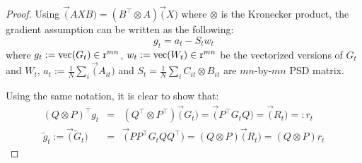 \begin{proof}
Using $\vec(AXB) = (B^\top \otimes A)\vec(X)$ where $\otimes$ is the Kronecker product, the gradient assumption can be written as the following:
\begin{equation}
    g_t = a_t - S_t w_t 
\end{equation}
where $g_t := \mathrm{vec}(G_t) \in {\textnormal{r}}^{mn}$, $w_t := \mathrm{vec}(W_t) \in{\textnormal{r}}^{mn}$ be the vectorized versions of $G_t$ and $W_t$, $a_t := \frac1N\sum_i \vec(A_{it})$ and $S_t = \frac1N\sum_i C_{it} \otimes B_{it}$ are $mn$-by-$mn$ PSD matrix. 

Using the same notation, it is clear to show that:
\begin{eqnarray}
    (Q\otimes P)^\top g_t &=& (Q^\top \otimes P^\top) \vec(G_t) = \vec(P^\top G_t Q) = \vec(R_t) =: r_t \\
    \tilde g_t := \vec(\tilde G_t) &=& \vec(PP^\top G_t QQ^\top) = (Q\otimes P)\vec(R_t) = (Q\otimes P)r_{t} 
\end{eqnarray}


\end{proof}
